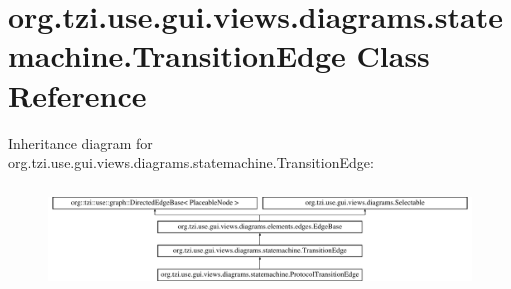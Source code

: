 \hypertarget{classorg_1_1tzi_1_1use_1_1gui_1_1views_1_1diagrams_1_1statemachine_1_1_transition_edge}{\section{org.\-tzi.\-use.\-gui.\-views.\-diagrams.\-statemachine.\-Transition\-Edge Class Reference}
\label{classorg_1_1tzi_1_1use_1_1gui_1_1views_1_1diagrams_1_1statemachine_1_1_transition_edge}
}
Inheritance diagram for org.\-tzi.\-use.\-gui.\-views.\-diagrams.\-statemachine.\-Transition\-Edge\-:\begin{figure}[H]
\begin{center}
\leavevmode
\includegraphics[height=2.779156cm]{classorg_1_1tzi_1_1use_1_1gui_1_1views_1_1diagrams_1_1statemachine_1_1_transition_edge}
\end{center}
\end{figure}
